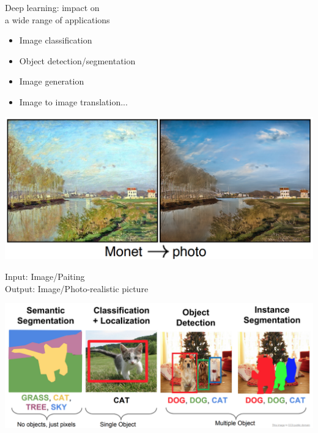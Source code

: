 \begin{frame}{Deep learning: impact on \\a wide range of applications}
\begin{minipage}{0.45\textwidth}
\begin{itemize}
\item Image classification
\item Object detection/segmentation
\item Image generation
\item Image to image translation...
\end{itemize}
\begin{center}
    \includegraphics[height=0.3\textheight]{figures/applications/image_trans.png}
\end{center}
\vspace{-2mm}
\scriptsize{Input: Image/Paiting}\\
\scriptsize{Output: Image/Photo-realistic picture}
\end{minipage}
\begin{minipage}{0.45\textwidth}
\vspace{5mm}
\begin{center}
    \includegraphics[height=0.35\textheight]{figures/applications/image_tasks.png}
\end{center}
\vspace{-2mm}

\end{minipage}
\end{frame}
